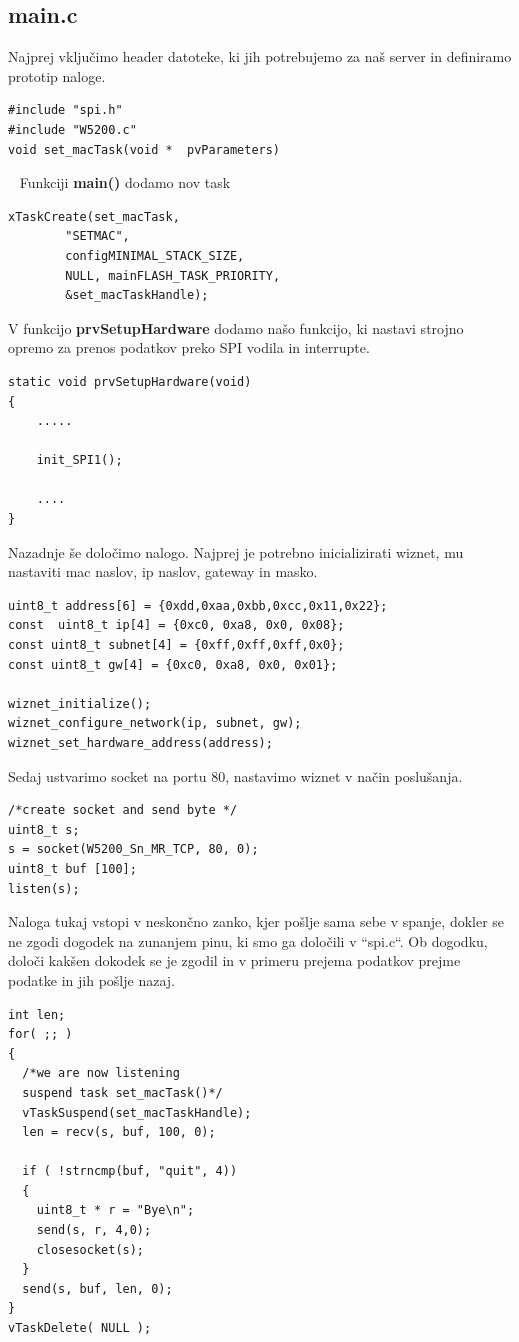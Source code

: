 \documentclass[12pt]{article}
\begin{document}
\subsection{main.c}
Najprej vključimo header datoteke, ki jih potrebujemo za naš server in definiramo prototip naloge. 
\begin{lstlisting}[frame = single ]
#include "spi.h"
#include "W5200.c"
void set_macTask(void *  pvParameters)
\end{lstlisting}  
Funkciji \textbf{main()} dodamo nov task
\begin{lstlisting}[frame = single ]
xTaskCreate(set_macTask, 
		"SETMAC", 
		configMINIMAL_STACK_SIZE, 
		NULL, mainFLASH_TASK_PRIORITY, 
		&set_macTaskHandle);
\end{lstlisting}  
V funkcijo \textbf{prvSetupHardware} dodamo našo funkcijo, ki nastavi strojno opremo za prenos podatkov preko SPI vodila in interrupte. 
\begin{lstlisting}[frame = single]
static void prvSetupHardware(void)
{
	.....
	
	init_SPI1();
	
	....
}
\end{lstlisting}
Nazadnje še določimo nalogo. Najprej je potrebno inicializirati wiznet, mu nastaviti mac naslov, ip naslov, gateway in masko. 
\begin{lstlisting}[frame = single ]
uint8_t address[6] = {0xdd,0xaa,0xbb,0xcc,0x11,0x22}; 
const  uint8_t ip[4] = {0xc0, 0xa8, 0x0, 0x08};
const uint8_t subnet[4] = {0xff,0xff,0xff,0x0};
const uint8_t gw[4] = {0xc0, 0xa8, 0x0, 0x01};

wiznet_initialize();	
wiznet_configure_network(ip, subnet, gw);
wiznet_set_hardware_address(address);

\end{lstlisting}
Sedaj ustvarimo socket na portu 80, nastavimo wiznet v način poslušanja.

\begin{lstlisting}[frame = single]	
/*create socket and send byte */
uint8_t s;
s = socket(W5200_Sn_MR_TCP, 80, 0);
uint8_t buf [100]; 
listen(s);
\end{lstlisting}
Naloga tukaj vstopi v neskončno zanko, kjer pošlje sama sebe v spanje, dokler se ne zgodi dogodek na zunanjem pinu, ki smo ga določili v “spi.c“. Ob dogodku, določi kakšen dokodek se je zgodil in v primeru prejema podatkov prejme podatke in jih pošlje nazaj. 
\begin{lstlisting}[frame = single]
int len;
for( ;; )
{
  /*we are now listening
  suspend task set_macTask()*/
  vTaskSuspend(set_macTaskHandle);
  len = recv(s, buf, 100, 0);

  if ( !strncmp(buf, "quit", 4))
  {
    uint8_t * r = "Bye\n"; 
    send(s, r, 4,0);
    closesocket(s);
  } 
  send(s, buf, len, 0);
}
vTaskDelete( NULL );

\end{lstlisting}
\end{document}
